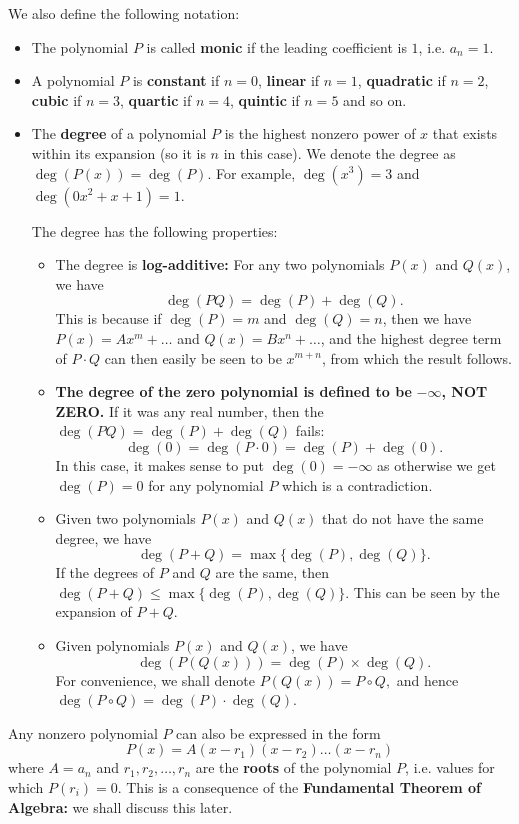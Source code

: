 \documentclass[12pt]{article}
\begin{document}
\noindent We also define the following notation:
\begin{itemize}
	\item The polynomial $P$ is called \textbf{monic} if the leading coefficient is $1$, i.e. $a_n=1$.
	\item A polynomial $P$ is \textbf{constant} if $n=0$, \textbf{linear} if $n=1$, \textbf{quadratic} if $n=2$, \textbf{cubic} if $n=3$, \textbf{quartic} if $n=4$, \textbf{quintic} if $n=5$ and so on.
	\item The \textbf{degree} of a polynomial $P$ is the highest nonzero power of $x$ that exists within its expansion (so it is $n$ in this case). We denote the degree as $\deg(P(x))=\deg(P)$. For example, $\deg(x^3)=3$ and $\deg(0x^2+x+1)=1$.
	
	\vspace{0mm}
	
	\noindent The degree has the following properties:
	\begin{itemize}
		\item The degree is \textbf{log-additive:} For any two polynomials $P(x)$ and $Q(x)$, we have \[\deg(PQ)=\deg(P)+\deg(Q).\] This is because if $\deg(P)=m$ and $\deg(Q)=n$, then we have $P(x)=Ax^m+\dots$ and $Q(x)=Bx^n+\dots$, and the highest degree term of $P\cdot Q$ can then easily be seen to be $x^{m+n}$, from which the result follows.
		\item \textbf{The degree of the zero polynomial is defined to be} $-\infty$\textbf{, NOT ZERO.} If it was any real number, then the $\deg(PQ)=\deg(P)+\deg(Q)$ fails: \[\deg(0)=\deg(P\cdot 0)=\deg(P)+\deg(0).\]In this case, it makes sense to put $\deg(0)=-\infty$ as otherwise we get $\deg(P)=0$ for any polynomial $P$ which is a contradiction.
		\item Given two polynomials $P(x)$ and $Q(x)$ that do not have the same degree, we have \[\deg(P+Q)=\max\{\deg(P),\deg(Q)\}.\] If the degrees of $P$ and $Q$ are the same, then $\deg(P+Q)\leq \max\{\deg(P),\deg(Q)\}.$ This can be seen by the expansion of $P+Q$.
		\item Given polynomials $P(x)$ and $Q(x)$, we have \[\deg(P(Q(x)))=\deg(P)\times \deg(Q).\] For convenience, we shall denote $P(Q(x))=P\circ Q,$ and hence $\deg(P\circ Q)=\deg(P)\cdot \deg(Q)$.
	\end{itemize}
\end{itemize}

\vspace{2mm}

\noindent Any nonzero polynomial $P$ can also be expressed in the form \[P(x)=A(x-r_1)(x-r_2)\dots (x-r_n)\] where $A=a_n$ and $r_1,r_2,\dots,r_n$ are the \textbf{roots} of the polynomial $P$, i.e. values for which $P(r_i)=0$. This is a consequence of the \textbf{Fundamental Theorem of Algebra:} we shall discuss this later.
\end{document}
